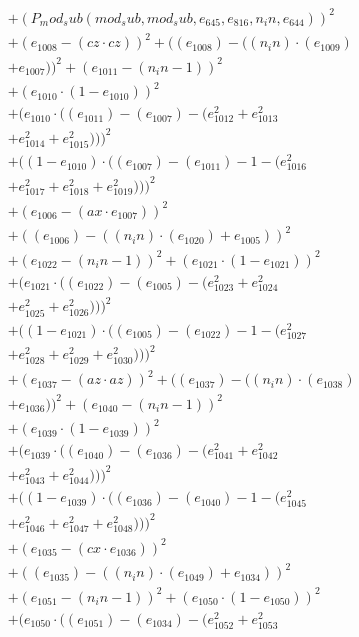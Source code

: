 \documentclass[10pt, a4paper]{article}
\begin{document}
\begin{small}
\begin{align*}
& + (P_mod_sub(mod_sub, mod_sub, e_{645}, e_{816}, n_in, e_{644}))^{2} \\
& + (e_{1008} - (cz  \cdot  cz))^{2} + ((e_{1008}) - ((n_in)  \cdot  (e_{1009}) \\
& + e_{1007}))^{2} + (e_{1011} - (n_in - 1))^{2} \\
& + (e_{1010}  \cdot  (1 - e_{1010}))^{2} \\
& + (e_{1010}  \cdot  ((e_{1011}) - (e_{1007}) - (e_{1012}^{2} + e_{1013}^{2} \\
& + e_{1014}^{2} + e_{1015}^{2})))^{2} \\
& + ((1 - e_{1010})  \cdot  ((e_{1007}) - (e_{1011}) - 1 - (e_{1016}^{2} \\
& + e_{1017}^{2} + e_{1018}^{2} + e_{1019}^{2})))^{2} \\
& + (e_{1006} - (ax  \cdot  e_{1007}))^{2} \\
& + ((e_{1006}) - ((n_in)  \cdot  (e_{1020}) + e_{1005}))^{2} \\
& + (e_{1022} - (n_in - 1))^{2} + (e_{1021}  \cdot  (1 - e_{1021}))^{2} \\
& + (e_{1021}  \cdot  ((e_{1022}) - (e_{1005}) - (e_{1023}^{2} + e_{1024}^{2} \\
& + e_{1025}^{2} + e_{1026}^{2})))^{2} \\
& + ((1 - e_{1021})  \cdot  ((e_{1005}) - (e_{1022}) - 1 - (e_{1027}^{2} \\
& + e_{1028}^{2} + e_{1029}^{2} + e_{1030}^{2})))^{2} \\
& + (e_{1037} - (az  \cdot  az))^{2} + ((e_{1037}) - ((n_in)  \cdot  (e_{1038}) \\
& + e_{1036}))^{2} + (e_{1040} - (n_in - 1))^{2} \\
& + (e_{1039}  \cdot  (1 - e_{1039}))^{2} \\
& + (e_{1039}  \cdot  ((e_{1040}) - (e_{1036}) - (e_{1041}^{2} + e_{1042}^{2} \\
& + e_{1043}^{2} + e_{1044}^{2})))^{2} \\
& + ((1 - e_{1039})  \cdot  ((e_{1036}) - (e_{1040}) - 1 - (e_{1045}^{2} \\
& + e_{1046}^{2} + e_{1047}^{2} + e_{1048}^{2})))^{2} \\
& + (e_{1035} - (cx  \cdot  e_{1036}))^{2} \\
& + ((e_{1035}) - ((n_in)  \cdot  (e_{1049}) + e_{1034}))^{2} \\
& + (e_{1051} - (n_in - 1))^{2} + (e_{1050}  \cdot  (1 - e_{1050}))^{2} \\
& + (e_{1050}  \cdot  ((e_{1051}) - (e_{1034}) - (e_{1052}^{2} + e_{1053}^{2} \\

\end{align*}
\end{small}
\end{document}
